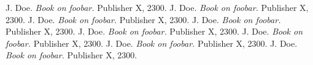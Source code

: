 \begin{thebibliography}{1}
 J. Doe. \emph{Book on foobar.} Publisher X,
2300.
 J. Doe. \emph{Book on foobar.} Publisher X,
2300.
 J. Doe. \emph{Book on foobar.} Publisher X,
2300.
 J. Doe. \emph{Book on foobar.} Publisher X,
2300.
 J. Doe. \emph{Book on foobar.} Publisher X,
2300.
 J. Doe. \emph{Book on foobar.} Publisher X,
2300.
 J. Doe. \emph{Book on foobar.} Publisher X,
2300.
 J. Doe. \emph{Book on foobar.} Publisher X,
2300.
\end{thebibliography}
